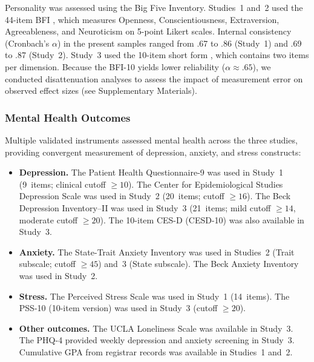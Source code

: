 \documentclass[12pt, a4paper]{article}
\begin{document}
Personality was assessed using the Big Five Inventory. Studies~1 and~2 used the 44-item BFI \citep[BFI-44;][]{john1999big}, which measures Openness, Conscientiousness, Extraversion, Agreeableness, and Neuroticism on 5-point Likert scales. Internal consistency (Cronbach's $\alpha$) in the present samples ranged from .67 to .86 (Study~1) and .69 to .87 (Study~2). Study~3 used the 10-item short form \citep[BFI-10;][]{rammstedt2007measuring}, which contains two items per dimension. Because the BFI-10 yields lower reliability ($\alpha \approx .65$), we conducted disattenuation analyses to assess the impact of measurement error on observed effect sizes (see Supplementary Materials).

\subsubsection{Mental Health Outcomes}

Multiple validated instruments assessed mental health across the three studies, providing convergent measurement of depression, anxiety, and stress constructs:

\begin{itemize}
    \item \textbf{Depression.} The Patient Health Questionnaire-9 \citep[PHQ-9;][]{kroenke2001phq9} was used in Study~1 (9~items; clinical cutoff $\geq 10$). The Center for Epidemiological Studies Depression Scale \citep[CES-D;][]{radloff1977cesd} was used in Study~2 (20~items; cutoff $\geq 16$). The Beck Depression Inventory--II \citep[BDI-II;][]{beck1996bdi} was used in Study~3 (21~items; mild cutoff $\geq 14$, moderate cutoff $\geq 20$). The 10-item CES-D (CESD-10) was also available in Study~3.
    \item \textbf{Anxiety.} The State-Trait Anxiety Inventory \citep[STAI;][]{spielberger1983manual} was used in Studies~2 (Trait subscale; cutoff $\geq 45$) and~3 (State subscale). The Beck Anxiety Inventory \citep[BAI;][]{beck1988inventory} was used in Study~2.
    \item \textbf{Stress.} The Perceived Stress Scale \citep[PSS;][]{cohen1983global} was used in Study~1 (14~items). The PSS-10 (10-item version) was used in Study~3 (cutoff $\geq 20$).
    \item \textbf{Other outcomes.} The UCLA Loneliness Scale \citep{russell1996ucla} was available in Study~3. The PHQ-4 \citep{lowe2010phq4} provided weekly depression and anxiety screening in Study~3. Cumulative GPA from registrar records was available in Studies~1 and~2.
\end{itemize}
\end{document}
